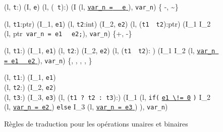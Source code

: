 \begin{figure*}[h!]
  \scriptsize{
    {
      {(l, \mbox{\lstinline't'}:)  (I, \mbox{\lstinline'e'})
      } {(l, (~\mbox{\lstinline't'}):) 
        (I
        \concat (l, \underline{\Zinit \mbox{\lstinline'var_n ='}
          ~~\mbox{\lstinline'e'} \Zclear}
        \semicolon),
        \mbox{\lstinline'var_n'})
      }{ \in \{ -, \sim\}}
    }

    {
      {(l, \mbox{\lstinline't1'}:ptr)  (I_1, \mbox{\lstinline'e1'})
        \quad
        (l, \mbox{\lstinline't2'}:int)  (I_2, \mbox{\lstinline'e2'})}
      {(l, (\mbox{\lstinline't1'}~~\mbox{\lstinline't2'}):ptr)
        (I_1 \concat I_2
        \concat (l, ptr~\mbox{\lstinline'var_n = e1'}~
        ~\mbox{\lstinline'e2;'}),
        \mbox{\lstinline'var_n'})
      }{ \in \{+, -\}}
    }

    {
      {(l, \mbox{\lstinline't1'}:) 
        (I_1, \mbox{\lstinline'e1'}) \quad
        (l, \mbox{\lstinline't2'}:)
         (I_2, \mbox{\lstinline'e2'})}
      {(l, (\mbox{\lstinline't1'}~~\mbox{\lstinline't2'}):
        ) 
        (I_1 \concat I_2 \concat (l,
        \underline{\Zinit \mbox{\lstinline'var_n = e1'} \Zclear
          ~~\mbox{\lstinline'e2'} \Zclear}
        \semicolon
        ), \mbox{\lstinline'var_n'})
      }{
         \in \{\mathtt{+}, \mathtt{-}, \mathtt{/}, \mathtt{\%},
        \mathtt{*} \}
      }
    }

    {
      {(l, \mbox{\lstinline't1'}:) 
        (I_1, \mbox{\lstinline'e1'}) \\
        (l, \mbox{\lstinline't2'}:) 
        (I_2, \mbox{\lstinline'e2'}) \\
        (l, \mbox{\lstinline't3'}:) 
        (I_3, \mbox{\lstinline'e3'})}
      {
        (l, (\mbox{\lstinline't1 ? t2 : t3'}):)
        (I_1
        \concat (l,
        \mbox{\lstinline'if('}
        \underline{\mbox{\lstinline'e1'}\Zclear \mbox{\lstinline' \!= 0'}}
        \mbox{\lstinline')'} \bopen
        I_2
        \concat
        (l, \underline{\Zinit \mbox{\lstinline'var_n = e2'} \Zclear}
        \semicolon )
        \bclose
        \mbox{\lstinline'else'} \bopen
        I_3
        \concat
        (l, \underline{\Zinit \mbox{\lstinline'var_n = e3'} \Zclear}
        \semicolon )
        \bclose ),
        \mbox{\lstinline'var_n'})
      }{}
    }
  }
  \caption{Règles de traduction pour les opérations unaires et binaires}
  \label{fig:op}
\end{figure*}
